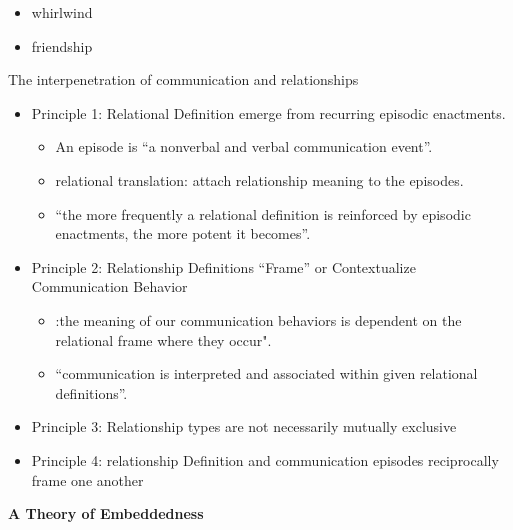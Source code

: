 \documentclass[
]{book}
\providecommand{\tightlist}{%
  \setlength{\itemsep}{0pt}\setlength{\parskip}{0pt}}
\begin{document}
\begin{itemize}
\tightlist
\item
  whirlwind\\
\item
  friendship
\end{itemize}

The interpenetration of communication and relationships

\begin{itemize}
\item
  Principle 1: Relational Definition emerge from recurring episodic enactments.\\

  \begin{itemize}
  \tightlist
  \item
    An episode is ``a nonverbal and verbal communication event''.\\
  \item
    relational translation: attach relationship meaning to the episodes.\\
  \item
    ``the more frequently a relational definition is reinforced by episodic enactments, the more potent it becomes''.
  \end{itemize}
\item
  Principle 2: Relationship Definitions ``Frame'' or Contextualize Communication Behavior\\

  \begin{itemize}
  \tightlist
  \item
    :the meaning of our communication behaviors is dependent on the relational frame where they occur".\\
  \item
    ``communication is interpreted and associated within given relational definitions''.\\
  \end{itemize}
\item
  Principle 3: Relationship types are not necessarily mutually exclusive\\
\item
  Principle 4: relationship Definition and communication episodes reciprocally frame one another
\end{itemize}

\textbf{A Theory of Embeddedness}
\end{document}
